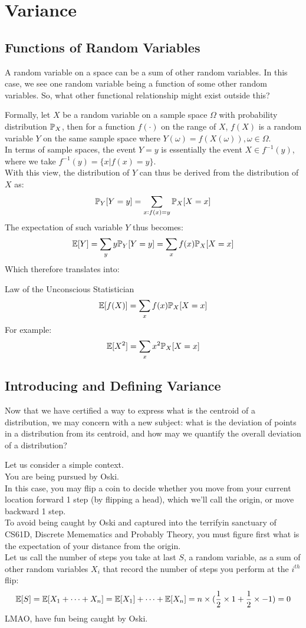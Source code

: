 \chapter{Variance}

\section{Functions of Random Variables}
A random variable on a space can be a sum of other random variables. In this case, we see one random variable being a function of some other random variables. So, what other functional relationship might exist outside this?

Formally, let $X$ be a random variable on a sample space $\Omega$ with probability distribution $\P_X$, then for a function $f(\cdot)$ on the range of $X$, $f(X)$ is a random variable $Y$ on the same sample space where $Y(\omega) = f(X(\omega)), \omega \in \Omega$. \\
In terms of sample spaces, the event $Y = y$ is essentially the event $X \in f^{-1}(y)$, where we take $f^{-1}(y) = \{x | f(x) = y\}$. \\
With this view, the distribution of $Y$ can thus be derived from the distribution of $X$ as:
\[\P_Y [Y = y] = \sum_{x:f(x) = y}\P_X [X = x]\]
The expectation of such variable $Y$ thus becomes:
\[\E[Y] = \sum_y y \P_Y [Y = y] = \sum_x f(x) \P_X [X = x]\]
Which therefore translates into:
\begin{ln-theorem}{Law of the Unconscious Statistician}{}
    \[\E[f(X)] = \sum_x f(x) \P_X [X = x]\]
    For example:
    \[\E[X^2] = \sum_x x^2 \P_X [X = x]\]
\end{ln-theorem}

\section{Introducing and Defining Variance}
Now that we have certified a way to express what is the centroid of a distribution, we may concern with a new subject: what is the deviation of points in a distribution from its centroid, and how may we quantify the overall deviation of a distribution?

Let us consider a simple context. \\
You are being pursued by Oski. \\
In this case, you may flip a coin to decide whether you move from your current location forward 1 step (by flipping a head), which we'll call the origin, or move backward 1 step. \\
To avoid being caught by Oski and captured into the terrifyin sanctuary of CS61D, Discrete Memematics and Probably Theory, you must figure first what is the expectation of your distance from the origin. \\
Let us call the number of steps you take at last $S$, a random variable, as a sum of other random variables $X_i$ that record the number of steps you perform at the $i^{th}$ flip:
\[\E[S] = \E[X_1 + \cdots + X_n] = \E[X_1] + \cdots + \E[X_n] = n \times (\frac{1}{2} \times 1 + \frac{1}{2} \times -1) = 0\]
LMAO, have fun being caught by Oski.

